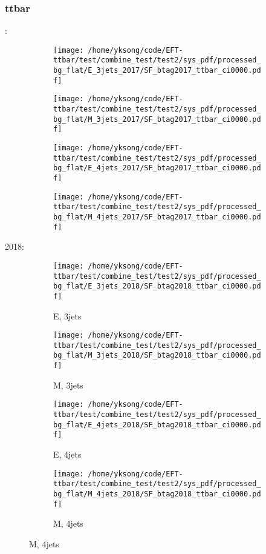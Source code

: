 \documentclass{beamer}
\begin{document}
\begin{frame}
\frametitle{ttbar}
\fontsize{5}{1}:
\begin{figure}
\centering
\begin{subfigure}[b]{0.24\textwidth}
\texttt{[image: /home/yksong/code/EFT-ttbar/test/combine\_test/test2/sys\_pdf/processed\_bg\_flat/E\_3jets\_2017/SF\_btag2017\_ttbar\_ci0000.pdf]}
\end{subfigure}
\begin{subfigure}[b]{0.24\textwidth}
\texttt{[image: /home/yksong/code/EFT-ttbar/test/combine\_test/test2/sys\_pdf/processed\_bg\_flat/M\_3jets\_2017/SF\_btag2017\_ttbar\_ci0000.pdf]}
\end{subfigure}
\begin{subfigure}[b]{0.24\textwidth}
\texttt{[image: /home/yksong/code/EFT-ttbar/test/combine\_test/test2/sys\_pdf/processed\_bg\_flat/E\_4jets\_2017/SF\_btag2017\_ttbar\_ci0000.pdf]}
\end{subfigure}
\begin{subfigure}[b]{0.24\textwidth}
\texttt{[image: /home/yksong/code/EFT-ttbar/test/combine\_test/test2/sys\_pdf/processed\_bg\_flat/M\_4jets\_2017/SF\_btag2017\_ttbar\_ci0000.pdf]}
\end{subfigure}
\end{figure}
2018:
\begin{figure}
\centering
\begin{subfigure}[b]{0.24\textwidth}
\texttt{[image: /home/yksong/code/EFT-ttbar/test/combine\_test/test2/sys\_pdf/processed\_bg\_flat/E\_3jets\_2018/SF\_btag2018\_ttbar\_ci0000.pdf]}
\captionsetup{font=tiny}
\caption{E, 3jets}
\end{subfigure}
\begin{subfigure}[b]{0.24\textwidth}
\texttt{[image: /home/yksong/code/EFT-ttbar/test/combine\_test/test2/sys\_pdf/processed\_bg\_flat/M\_3jets\_2018/SF\_btag2018\_ttbar\_ci0000.pdf]}
\captionsetup{font=tiny}
\caption{M, 3jets}
\end{subfigure}
\begin{subfigure}[b]{0.24\textwidth}
\texttt{[image: /home/yksong/code/EFT-ttbar/test/combine\_test/test2/sys\_pdf/processed\_bg\_flat/E\_4jets\_2018/SF\_btag2018\_ttbar\_ci0000.pdf]}
\captionsetup{font=tiny}
\caption{E, 4jets}
\end{subfigure}
\begin{subfigure}[b]{0.24\textwidth}
\texttt{[image: /home/yksong/code/EFT-ttbar/test/combine\_test/test2/sys\_pdf/processed\_bg\_flat/M\_4jets\_2018/SF\_btag2018\_ttbar\_ci0000.pdf]}
\captionsetup{font=tiny}
\caption{M, 4jets}
\end{subfigure}
\end{figure}
\end{frame}
\end{document}
